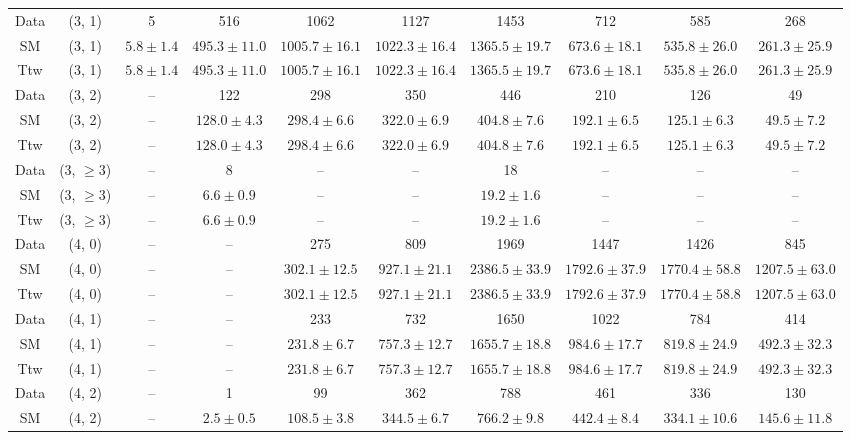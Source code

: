\begin{table}[h!]
{\begin{tabular}{cccccccccc}
	Data & (3, 1) & 5 & 516 & 1062 & 1127 & 1453 & 712 & 585 & 268 \\[0.5ex] 
	SM & (3, 1) & $5.8\pm 1.4$ & $495.3\pm 11.0$ & $1005.7\pm 16.1$ & $1022.3\pm 16.4$ & $1365.5\pm 19.7$ & $673.6\pm 18.1$ & $535.8\pm 26.0$ & $261.3\pm 25.9$ \\[0.5ex] 
	Ttw & (3, 1) & $5.8\pm 1.4$ & $495.3\pm 11.0$ & $1005.7\pm 16.1$ & $1022.3\pm 16.4$ & $1365.5\pm 19.7$ & $673.6\pm 18.1$ & $535.8\pm 26.0$ & $261.3\pm 25.9$ \\[0.5ex] 
	Data & (3, 2) & -- & 122 & 298 & 350 & 446 & 210 & 126 & 49 \\[0.5ex] 
	SM & (3, 2) & -- & $128.0\pm 4.3$ & $298.4\pm 6.6$ & $322.0\pm 6.9$ & $404.8\pm 7.6$ & $192.1\pm 6.5$ & $125.1\pm 6.3$ & $49.5\pm 7.2$ \\[0.5ex] 
	Ttw & (3, 2) & -- & $128.0\pm 4.3$ & $298.4\pm 6.6$ & $322.0\pm 6.9$ & $404.8\pm 7.6$ & $192.1\pm 6.5$ & $125.1\pm 6.3$ & $49.5\pm 7.2$ \\[0.5ex] 
	Data & (3, $\ge3$) & -- & 8 & -- & -- & 18 & -- & -- & -- \\[0.5ex] 
	SM & (3, $\ge3$) & -- & $6.6\pm 0.9$ & -- & -- & $19.2\pm 1.6$ & -- & -- & -- \\[0.5ex] 
	Ttw & (3, $\ge3$) & -- & $6.6\pm 0.9$ & -- & -- & $19.2\pm 1.6$ & -- & -- & -- \\[0.5ex] 
	Data & (4, 0) & -- & -- & 275 & 809 & 1969 & 1447 & 1426 & 845 \\[0.5ex] 
	SM & (4, 0) & -- & -- & $302.1\pm 12.5$ & $927.1\pm 21.1$ & $2386.5\pm 33.9$ & $1792.6\pm 37.9$ & $1770.4\pm 58.8$ & $1207.5\pm 63.0$ \\[0.5ex] 
	Ttw & (4, 0) & -- & -- & $302.1\pm 12.5$ & $927.1\pm 21.1$ & $2386.5\pm 33.9$ & $1792.6\pm 37.9$ & $1770.4\pm 58.8$ & $1207.5\pm 63.0$ \\[0.5ex] 
	Data & (4, 1) & -- & -- & 233 & 732 & 1650 & 1022 & 784 & 414 \\[0.5ex] 
	SM & (4, 1) & -- & -- & $231.8\pm 6.7$ & $757.3\pm 12.7$ & $1655.7\pm 18.8$ & $984.6\pm 17.7$ & $819.8\pm 24.9$ & $492.3\pm 32.3$ \\[0.5ex] 
	Ttw & (4, 1) & -- & -- & $231.8\pm 6.7$ & $757.3\pm 12.7$ & $1655.7\pm 18.8$ & $984.6\pm 17.7$ & $819.8\pm 24.9$ & $492.3\pm 32.3$ \\[0.5ex] 
	Data & (4, 2) & -- & 1 & 99 & 362 & 788 & 461 & 336 & 130 \\[0.5ex] 
	SM & (4, 2) & -- & $2.5\pm 0.5$ & $108.5\pm 3.8$ & $344.5\pm 6.7$ & $766.2\pm 9.8$ & $442.4\pm 8.4$ & $334.1\pm 10.6$ & $145.6\pm 11.8$ \\[0.5ex] 

\end{tabular}}
\end{table}

